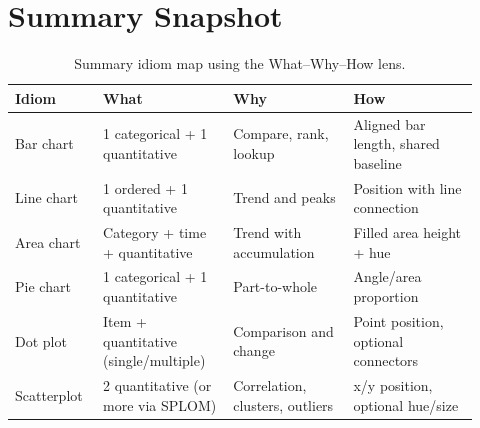 \section{Summary Snapshot}
\begin{table}[htbp]
    \centering
    \footnotesize
    \begin{tabular}{@{}p{0.17\linewidth}p{0.26\linewidth}p{0.24\linewidth}p{0.25\linewidth}@{}}
        \textbf{Idiom} & \textbf{What} & \textbf{Why} & \textbf{How} \\
        \hline
        Bar chart & 1 categorical + 1 quantitative & Compare, rank, lookup & Aligned bar length, shared baseline \\
        Line chart & 1 ordered + 1 quantitative & Trend and peaks & Position with line connection \\
        Area chart & Category + time + quantitative & Trend with accumulation & Filled area height + hue \\
        Pie chart & 1 categorical + 1 quantitative & Part-to-whole & Angle/area proportion \\
        Dot plot & Item + quantitative (single/multiple) & Comparison and change & Point position, optional connectors \\
        Scatterplot & 2 quantitative (or more via SPLOM) & Correlation, clusters, outliers & x/y position, optional hue/size \\
    \end{tabular}
    \caption{Summary idiom map using the What--Why--How lens.}
    \label{tab:idiom-selection-snapshot}
\end{table}
